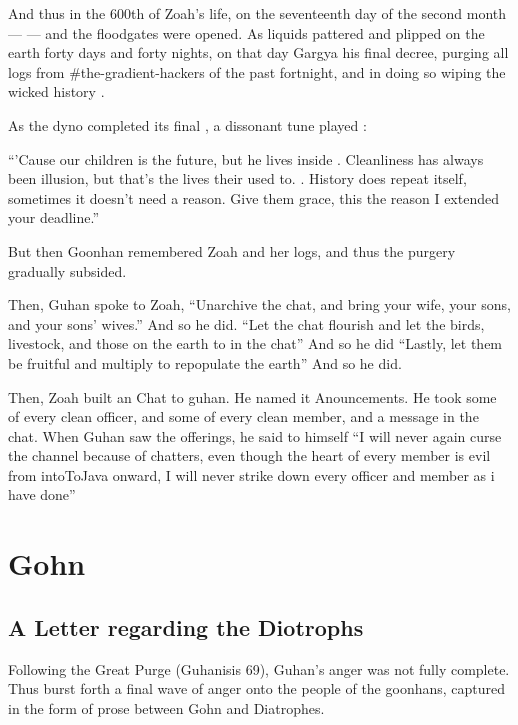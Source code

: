 \documentclass{article}
\begin{document}
And thus in the 600th  of Zoah's life, on the seventeenth day of the second month ---  --- and the floodgates  were opened. As liquids pattered and plipped on the earth forty days and forty nights, on that day Gargya  his final decree, purging all logs from \#the-gradient-hackers of the past fortnight, and in doing so wiping the wicked history .

As the dyno completed its final , a dissonant tune played :

“'Cause our children is the future, but he lives inside . Cleanliness has always been illusion, but that's the lives their used to. . History does repeat itself, sometimes it doesn't need a reason. Give them grace, this the reason I extended your deadline.”

But then Goonhan remembered Zoah and her logs, and thus the purgery gradually subsided.

Then, Guhan spoke to Zoah, “Unarchive the chat, and bring your wife, your sons, and your sons’ wives.” And so he did. “Let the chat flourish and let the birds, livestock, and those on the earth to  in the chat” And so he did “Lastly, let them be fruitful and multiply to repopulate the earth” And so he did. %

Then, Zoah built an Chat to guhan. He named it Anouncements. He took some of every clean officer, and some of every clean member, and a message in the chat. When Guhan saw the offerings, he said to himself  “I will never again curse the channel because of chatters, even though the heart of every member is evil from intoToJava onward, I will never strike down every officer and member as i have done” %


\section{Gohn}

\subsection{A Letter regarding the Diotrophs}

Following the Great Purge (Guhanisis 69), Guhan’s anger  was not fully complete. Thus burst forth a final wave of anger onto the people of the goonhans, captured in the form of prose between Gohn and Diatrophes. 
\end{document}
